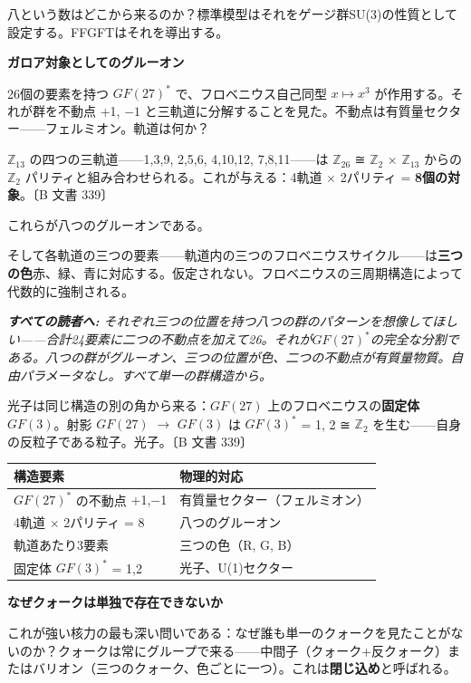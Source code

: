 \documentclass[11pt,openany]{book}
\newenvironment{laierspur}{%
  \par\vspace{4pt}%
  \noindent\small\itshape\color{blue!60!black}%
  \textbf{すべての読者へ:}\enspace\ignorespaces}{%
  \par\vspace{4pt}\normalsize\normalfont\normalcolor}
\begin{document}
八という数はどこから来るのか？標準模型はそれをゲージ群SU(3)の性質として設定する。FFGFTはそれを導出する。

\textbf{ガロア対象としてのグルーオン}

26個の要素を持つ $GF(27)^*$ で、フロベニウス自己同型 $x \mapsto x^3$ が作用する。それが群を不動点 {+1, $-1$} と三軌道に分解することを見た。不動点は有質量セクター——フェルミオン。軌道は何か？

$\mathbb{Z}_{13}$ の四つの三軌道——{1,3,9}, {2,5,6}, {4,10,12}, {7,8,11}——は $\mathbb{Z}_{26}$ ≅ $\mathbb{Z}_2$ × $\mathbb{Z}_{13}$ からの $\mathbb{Z}_2$ パリティと組み合わせられる。これが与える：4軌道 $\times$ 2パリティ = \textbf{8個の対象}。〔B 文書 339〕

これらが八つのグルーオンである。

そして各軌道の三つの要素——軌道内の三つのフロベニウスサイクル——は\textbf{三つの色}赤、緑、青に対応する。仮定されない。フロベニウスの三周期構造によって代数的に強制される。

\begin{laierspur}
それぞれ三つの位置を持つ八つの群のパターンを想像してほしい——合計24要素に二つの不動点を加えて26。それが$GF(27)^*$の完全な分割である。八つの群がグルーオン、三つの位置が色、二つの不動点が有質量物質。自由パラメータなし。すべて単一の群構造から。
\end{laierspur}

光子は同じ構造の別の角から来る：$GF(27)$ 上のフロベニウスの\textbf{固定体 $GF(3)$}。射影 $GF(27)$ $\to$ $GF(3)$ は $GF(3)^*$ = {1, 2} ≅ $\mathbb{Z}_2$ を生む——自身の反粒子である粒子。光子。〔B 文書 339〕

\begin{tabular}{ll}
\toprule
構造要素 & 物理的対応 \\
\midrule
$GF(27)^*$ の不動点 {+1,$-$1} & 有質量セクター（フェルミオン） \\
4軌道 $\times$ 2パリティ = 8 & 八つのグルーオン \\
軌道あたり3要素 & 三つの色（R, G, B） \\
固定体 $GF(3)^*$ = {1,2} & 光子、U(1)セクター \\
\bottomrule
\end{tabular}

\textbf{なぜクォークは単独で存在できないか}

これが強い核力の最も深い問いである：なぜ誰も単一のクォークを見たことがないのか？クォークは常にグループで来る——中間子（クォーク+反クォーク）またはバリオン（三つのクォーク、色ごとに一つ）。これは\textbf{閉じ込め}と呼ばれる。
\end{document}

